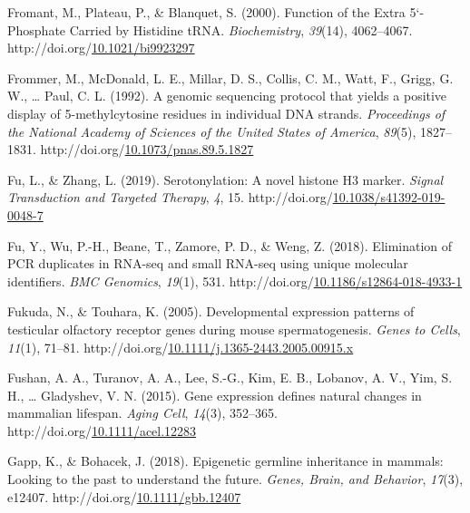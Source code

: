 \documentclass[12pt,twoside]{reedthesis}
\newlength{\cslhangindent}
\newenvironment{CSLReferences}[2] %
 {%
  \setlength{\parindent}{0pt}
  \ifodd #1 \everypar{\setlength{\hangindent}{\cslhangindent}}\ignorespaces\fi
  \ifnum #2 > 0
  \setlength{\parskip}{#2\baselineskip}
  \fi
 }%
 {}
\begin{document}
\begin{CSLReferences}{1}{0}
\leavevmode{}%
Fromant, M., Plateau, P., \& Blanquet, S. (2000). Function of the Extra 5{`}-Phosphate Carried by Histidine tRNA. \emph{Biochemistry}, \emph{39}(14), 4062--4067. http://doi.org/\href{https://doi.org/10.1021/bi9923297}{10.1021/bi9923297}

\leavevmode{}%
Frommer, M., McDonald, L. E., Millar, D. S., Collis, C. M., Watt, F., Grigg, G. W., \ldots{} Paul, C. L. (1992). A genomic sequencing protocol that yields a positive display of 5-methylcytosine residues in individual DNA strands. \emph{Proceedings of the National Academy of Sciences of the United States of America}, \emph{89}(5), 1827--1831. http://doi.org/\href{https://doi.org/10.1073/pnas.89.5.1827}{10.1073/pnas.89.5.1827}

\leavevmode{}%
Fu, L., \& Zhang, L. (2019). Serotonylation: A novel histone H3 marker. \emph{Signal Transduction and Targeted Therapy}, \emph{4}, 15. http://doi.org/\href{https://doi.org/10.1038/s41392-019-0048-7}{10.1038/s41392-019-0048-7}

\leavevmode{}%
Fu, Y., Wu, P.-H., Beane, T., Zamore, P. D., \& Weng, Z. (2018). Elimination of PCR duplicates in RNA-seq and small RNA-seq using unique molecular identifiers. \emph{BMC Genomics}, \emph{19}(1), 531. http://doi.org/\href{https://doi.org/10.1186/s12864-018-4933-1}{10.1186/s12864-018-4933-1}

\leavevmode{}%
Fukuda, N., \& Touhara, K. (2005). Developmental expression patterns of testicular olfactory receptor genes during mouse spermatogenesis. \emph{Genes to Cells}, \emph{11}(1), 71--81. http://doi.org/\href{https://doi.org/10.1111/j.1365-2443.2005.00915.x}{10.1111/j.1365-2443.2005.00915.x}

\leavevmode{}%
Fushan, A. A., Turanov, A. A., Lee, S.-G., Kim, E. B., Lobanov, A. V., Yim, S. H., \ldots{} Gladyshev, V. N. (2015). Gene expression defines natural changes in mammalian lifespan. \emph{Aging Cell}, \emph{14}(3), 352--365. http://doi.org/\href{https://doi.org/10.1111/acel.12283}{10.1111/acel.12283}

\leavevmode{}%
Gapp, K., \& Bohacek, J. (2018). Epigenetic germline inheritance in mammals: Looking to the past to understand the future. \emph{Genes, Brain, and Behavior}, \emph{17}(3), e12407. http://doi.org/\href{https://doi.org/10.1111/gbb.12407}{10.1111/gbb.12407}


\end{CSLReferences}
\end{document}
